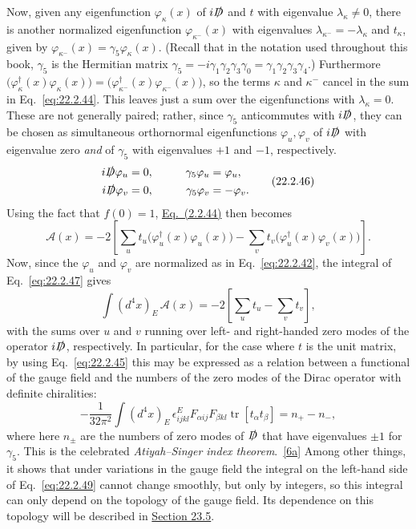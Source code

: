 Now, given any eigenfunction $\varphi_\kappa(x)$ of $i\sl{D}$ and $t$ with
eigenvalue $\lambda_\kappa\ne0$, there is another normalized eigenfunction
$\varphi_{\kappa^-}(x)$ with eigenvalues
$\lambda_{\kappa^-}=-\lambda_\kappa$ and $t_\kappa$, given by
$\varphi_{\kappa^-}(x)=\gamma_5\varphi_\kappa(x)$. (Recall that in the
notation used throughout this book, $\gamma_5$ is the Hermitian matrix
$\gamma_5=-i\gamma_1\gamma_2\gamma_3\gamma_0
=\gamma_1\gamma_2\gamma_3\gamma_4$.) Furthermore
$\bigl(\varphi_\kappa^\dagger(x)\varphi_\kappa(x)\bigr)
=\bigl(\varphi_{\kappa^-}^\dagger(x)\varphi_{\kappa^-}(x)\bigr)$, so the
terms $\kappa$ and $\kappa^-$ cancel in the sum in
Eq.~\eqref{eq:22.2.44}. This leaves just a sum over the eigenfunctions with
$\lambda_\kappa=0$. These are not generally paired; rather, since
$\gamma_5$ anticommutes with $i\sl{D}$, they can be chosen as simultaneous
orthornormal eigenfunctions $\varphi_u,\varphi_v$ of $i\sl{D}$ with
eigenvalue zero \emph{and} of $\gamma_5$ with eigenvalues $+1$ and $-1$,
respectively.
\begin{equation}
 \begin{aligned}
 i\sl{D}\varphi_u&=0,&\qquad \gamma_5\varphi_u&=\varphi_u,\\
 i\sl{D}\varphi_v&=0,& \gamma_5\varphi_v&=-\varphi_v.
 \end{aligned}
 \tag{22.2.46}\label{eq:22.2.46}
\end{equation}
Using the fact that $f(0)=1$,
\hyperref[eq:22.2.44]{Eq.~(2.2.44)} then becomes
\begin{equation}
 \mathcal A(x)=-2\left[
 \sum_u t_u\bigl(\varphi_u^\dagger(x)\varphi_u(x)\bigr)
 -\sum_v t_v\bigl(\varphi_u^\dagger(x)\varphi_v(x)\bigr)
 \right].
 \tag{22.2.47}\label{eq:22.2.47}
\end{equation}
Now, since the $\varphi_u$ and $\varphi_v$ are normalized as in
Eq.~\eqref{eq:22.2.42}, the integral of Eq.~\eqref{eq:22.2.47} gives
\begin{equation}
 \int(d^4x)_E\,\mathcal A(x)
 =-2\left[\sum_u t_u-\sum_v t_v\right],
 \tag{22.2.48}\label{eq:22.2.48}
\end{equation}
with the sums over $u$ and $v$ running over left- and right-handed zero
modes of the operator $i\sl{D}$, respectively. In particular, for the case
where $t$ is the unit matrix, by using Eq.~\eqref{eq:22.2.45} this may be
expressed as a relation between a functional of the gauge field and the
numbers of the zero modes of the Dirac operator with definite chiralities:
\begin{equation}
 -\frac{1}{32\pi^2}\int(d^4x)_E\,\epsilon^E_{ijkl}
 F_{\alpha ij}F_{\beta kl}\operatorname{tr}[t_\alpha t_\beta]
 =n_+-n_-,
 \tag{22.2.49}\label{eq:22.2.49}
\end{equation}
where here $n_\pm$ are the numbers of zero modes of $\sl{D}$ that have
eigenvalues $\pm1$ for $\gamma_5$. This is the celebrated
\emph{Atiyah--Singer index theorem}.~\hyperref[ch22-ref-6a]{[6a]} Among
other things, it shows that under variations in the gauge field the integral
on the left-hand side of Eq.~\eqref{eq:22.2.49} cannot change smoothly,
but only by integers, so this integral can only depend on the topology of
the gauge field. Its dependence on this topology will be described in
\hyperref[sec:23.5]{Section 23.5}.
